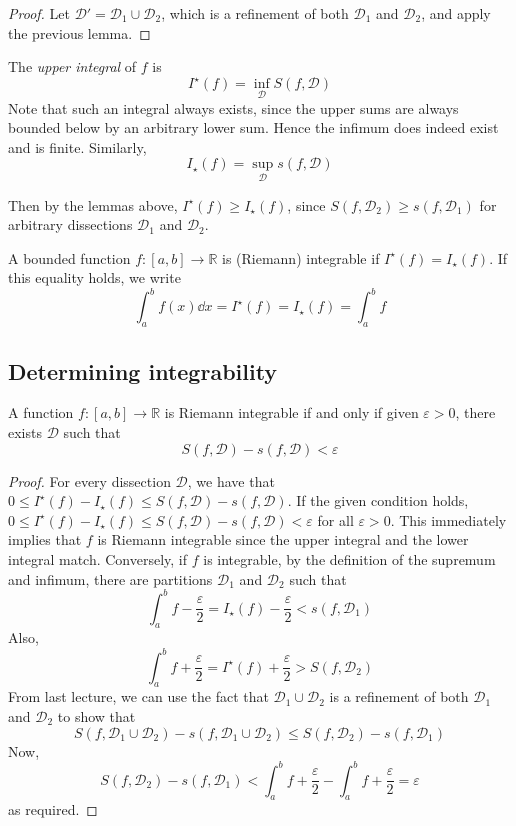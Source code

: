 \begin{proof}
	Let \(\mathcal D' = \mathcal D_1 \cup \mathcal D_2\), which is a refinement of both \(\mathcal D_1\) and \(\mathcal D_2\), and apply the previous lemma.
\end{proof}
\begin{definition}
	The \textit{upper integral} of \(f\) is
	\[
		I^\star(f) = \inf_{\mathcal D} S(f, \mathcal D)
	\]
	Note that such an integral always exists, since the upper sums are always bounded below by an arbitrary lower sum.
	Hence the infimum does indeed exist and is finite.
	Similarly,
	\[
		I_\star(f) = \sup_{\mathcal D} s(f, \mathcal D)
	\]
\end{definition}
Then by the lemmas above, \(I^\star(f) \geq I_\star(f)\), since \(S(f, \mathcal D_2) \geq s(f, \mathcal D_1)\) for arbitrary dissections \(\mathcal D_1\) and \(\mathcal D_2\).
\begin{definition}
	A bounded function \(f \colon [a, b] \to \mathbb R\) is (Riemann) integrable if \(I^\star(f) = I_\star(f)\).
	If this equality holds, we write
	\[
		\int_a^b f(x) \dd{x} = I^\star(f) = I_\star(f) = \int_a^b f
	\]
\end{definition}

\subsection{Determining integrability}
\begin{theorem}
	A function \(f \colon [a, b] \to \mathbb R\) is Riemann integrable if and only if given \(\varepsilon > 0\), there exists \(\mathcal D\) such that
	\[
		S(f, \mathcal D) - s(f, \mathcal D) < \varepsilon
	\]
\end{theorem}
\begin{proof}
	For every dissection \(\mathcal D\), we have that \(0 \leq I^\star(f) - I_\star(f) \leq S(f, \mathcal D) - s(f, \mathcal D)\).
	If the given condition holds, \(0 \leq I^\star(f) - I_\star(f) \leq S(f, \mathcal D) - s(f, \mathcal D) < \varepsilon\) for all \(\varepsilon > 0\).
	This immediately implies that \(f\) is Riemann integrable since the upper integral and the lower integral match.
	Conversely, if \(f\) is integrable, by the definition of the supremum and infimum, there are partitions \(\mathcal D_1\) and \(\mathcal D_2\) such that
	\[
		\int_a^b f - \frac{\varepsilon}{2} = I_\star(f) - \frac{\varepsilon}{2} < s(f, \mathcal D_1)
	\]
	Also,
	\[
		\int_a^b f + \frac{\varepsilon}{2} = I^\star(f) + \frac{\varepsilon}{2} > S(f, \mathcal D_2)
	\]
	From last lecture, we can use the fact that \(\mathcal D_1 \cup \mathcal D_2\) is a refinement of both \(\mathcal D_1\) and \(\mathcal D_2\) to show that
	\[
		S(f, \mathcal D_1 \cup \mathcal D_2) - s(f, \mathcal D_1 \cup \mathcal D_2) \leq S(f, \mathcal D_2) - s(f, \mathcal D_1)
	\]
	Now,
	\[
		S(f, \mathcal D_2) - s(f, \mathcal D_1) < \int_a^b f + \frac{\varepsilon}{2} - \int_a^b f + \frac{\varepsilon}{2} = \varepsilon
	\]
	as required.
\end{proof}


